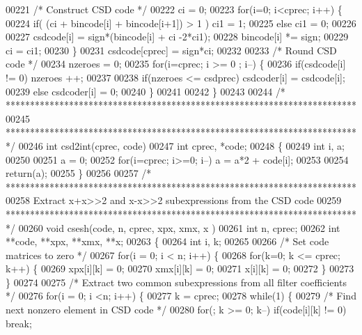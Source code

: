 \begin{DoxyCode}
{{{{{{{{{{{{{{{{{{{{00221     \textcolor{comment}{/* Construct CSD code */}
00222     ci = 0;
00223     \textcolor{keywordflow}{for}(i=0; i<cprec; i++) \{
00224         \textcolor{keywordflow}{if}( (ci + bincode[i] + bincode[i+1]) > 1 ) ci1 = 1;
00225         \textcolor{keywordflow}{else} ci1 = 0;
00226 
00227         csdcode[i] = sign*(bincode[i] + ci -2*ci1);
00228         bincode[i] *= sign;
00229         ci = ci1;
00230     \}
00231     csdcode[cprec] = sign*ci;
00232 
00233     \textcolor{comment}{/* Round CSD code */}
00234     nzeroes = 0;
00235     \textcolor{keywordflow}{for}(i=cprec; i >= 0 ; i--) \{
00236         \textcolor{keywordflow}{if}(csdcode[i] != 0) nzeroes ++;
00237 
00238         \textcolor{keywordflow}{if}(nzeroes <= csdprec) csdcoder[i] = csdcode[i];
00239         \textcolor{keywordflow}{else} csdcoder[i] = 0;
00240     \}
00241 
00242 \}
00243 
00244 \textcolor{comment}{/* ************************************************************************ }
00245 \textcolor{comment}{   ************************************************************************ */}
00246 \textcolor{keywordtype}{int} csd2int(cprec, code)
00247 int cprec, *code;
00248 \{
00249     \textcolor{keywordtype}{int} i, a;
00250     
00251     a = 0;
00252     \textcolor{keywordflow}{for}(i=cprec; i>=0; i--) a = a*2 + code[i];
00253 
00254     \textcolor{keywordflow}{return}(a);
00255 \}
00256 
00257 \textcolor{comment}{/* ************************************************************************ }
00258 \textcolor{comment}{    Extract x+x>>2 and x-x>>2 subexpressions from the CSD code}
00259 \textcolor{comment}{   ************************************************************************ */}
00260 \textcolor{keywordtype}{void} csesh(code, n, cprec, xpx, xmx, x )
00261 int n, cprec;
00262 \textcolor{keywordtype}{int} **code, **xpx, **xmx, **x;
00263 \{
00264     \textcolor{keywordtype}{int} i, k;
00265 
00266     \textcolor{comment}{/* Set code matrices to zero */}
00267     \textcolor{keywordflow}{for}(i = 0; i < n; i++) \{
00268         \textcolor{keywordflow}{for}(k=0; k <= cprec; k++) \{
00269             xpx[i][k] = 0;
00270             xmx[i][k] = 0;
00271             x[i][k] = 0;
00272         \}
00273     \}
00274             
00275     \textcolor{comment}{/* Extract two common subexpressions from all filter coefficients */}
00276     \textcolor{keywordflow}{for}(i = 0; i <n; i++) \{
00277         k = cprec;
00278         \textcolor{keywordflow}{while}(1) \{
00279             \textcolor{comment}{/* Find next nonzero element in CSD code */}
00280             \textcolor{keywordflow}{for}(; k >= 0; k--) \textcolor{keywordflow}{if}(code[i][k] != 0) \textcolor{keywordflow}{break};
}}}}}}}}}}}}}}}}}}}}
\end{DoxyCode}
